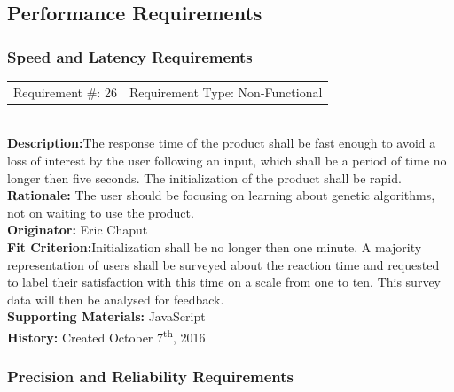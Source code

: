 \documentclass[12pt, titlepage]{article}
\begin{document}
\newpage

\subsection{Performance Requirements}

\subsubsection{Speed and Latency Requirements}

\begin{reqbox}
%
\begin{tabular}{cc}
Requirement \#: 26 & Requirement Type: Non-Functional \\
\end{tabular} \\
%
\textbf{Description:}The response time of the product shall be fast enough to 
avoid a loss of 
interest by the user following an input, which shall be a period of time no 
longer then five seconds. The initialization of the product shall be rapid.  \\
\textbf{Rationale:}  The user should be focusing on learning about genetic 
algorithms, not on waiting to use the product.\\
\textbf{Originator:} Eric Chaput\\
\textbf{Fit Criterion:}Initialization shall be no longer then one minute. A 
majority representation of users shall be surveyed about the reaction time and 
requested to label their satisfaction with this time on a scale from one to ten. 
This survey data will then be analysed for feedback.\\
%  
\textbf{Supporting Materials:} JavaScript \\
\textbf{History:} Created October 7\textsuperscript{th}, 2016
%
\end{reqbox}

\subsubsection{Precision and Reliability Requirements}
\end{document}
